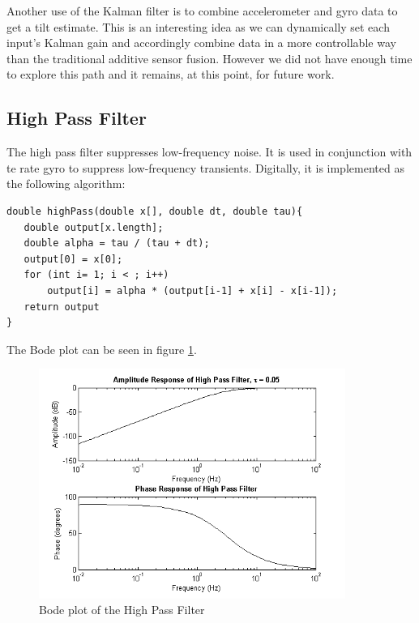 \documentclass{article}
\theoremstyle{plain}
\theoremstyle{definition}
\theoremstyle{remark}
\begin{document}
Another use of the Kalman filter is to combine accelerometer and gyro data to get a tilt estimate. This is an interesting idea as we can dynamically set each input's Kalman gain and accordingly combine data in a more controllable way than the traditional additive sensor fusion. However we did not have enough time to explore this path and it remains, at this point, for future work.


\subsection{High Pass Filter}
The high pass filter suppresses low-frequency noise. It is used in conjunction with te rate gyro to suppress low-frequency transients. Digitally, it is implemented as the following algorithm:
\begin{verbatim}
double highPass(double x[], double dt, double tau){
   double output[x.length];
   double alpha = tau / (tau + dt);
   output[0] = x[0];
   for (int i= 1; i < ; i++)
       output[i] = alpha * (output[i-1] + x[i] - x[i-1]);
   return output
}
\end{verbatim}

The Bode plot can be seen in figure \ref{bode_HPF}.

\begin{figure}[hbt]
\begin{center}
\includegraphics[width = 10cm]{bode_HPF}
\caption{Bode plot of the High Pass Filter}
\label{bode_HPF}
\end{center}
\end{figure}
\end{document}
